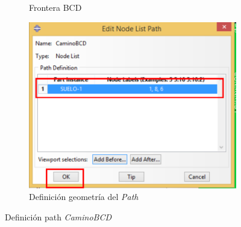 \begin{itemize}
\begin{figure}[!h]
\begin{subfigure}[!h]{0.07\textwidth}
      \caption{Frontera BCD}
      \label{post29}
    \end{subfigure}\quad%
    \begin{subfigure}[!h]{0.60\textwidth}
      \includegraphics[width=\textwidth]{./body/images/post30.pdf}
      \caption{Definición geometría del \textit{Path}}
      \label{post30}
    \end{subfigure}%
    \caption{Definición path \textit{CaminoBCD}}
  \end{figure}


\end{itemize}
